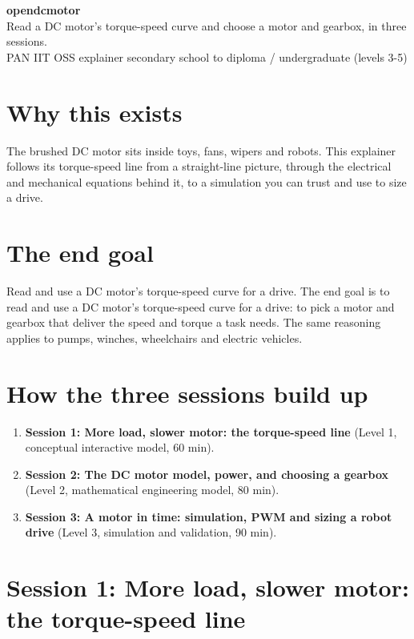 \documentclass[11pt,a4paper]{article}
\begin{document}
\begin{center}{\LARGE\bfseries opendcmotor}\\[0.4em]{\large Read a DC motor's torque-speed curve and choose a motor and gearbox, in three sessions.}\\[0.2em]\small PAN IIT OSS explainer \textbullet{} secondary school to diploma / undergraduate (levels 3-5)\end{center}

\section*{Why this exists}
The brushed DC motor sits inside toys, fans, wipers and robots. This explainer follows its torque-speed line from a straight-line picture, through the electrical and mechanical equations behind it, to a simulation you can trust and use to size a drive.

\section*{The end goal}
Read and use a DC motor's torque-speed curve for a drive. The end goal is to read and use a DC motor's torque-speed curve for a drive: to pick a motor and gearbox that deliver the speed and torque a task needs. The same reasoning applies to pumps, winches, wheelchairs and electric vehicles.

\section*{How the three sessions build up}
\begin{enumerate}[nosep]
\item \textbf{Session 1: More load, slower motor: the torque-speed line} (Level 1, conceptual interactive model, 60 min).
\item \textbf{Session 2: The DC motor model, power, and choosing a gearbox} (Level 2, mathematical engineering model, 80 min).
\item \textbf{Session 3: A motor in time: simulation, PWM and sizing a robot drive} (Level 3, simulation and validation, 90 min).
\end{enumerate}

\section{Session 1: More load, slower motor: the torque-speed line}
\end{document}
